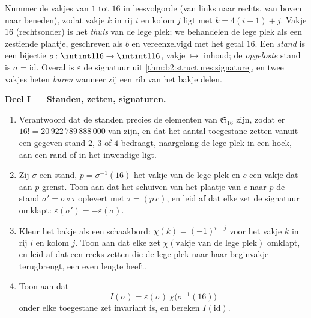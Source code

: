 \begin{problem}
\label{pb:b2:structures:1}
Nummer de vakjes van $1$ tot $16$ in leesvolgorde (van links naar
rechts, van boven naar beneden), zodat vakje $k$ in rij $i$ en
kolom $j$ ligt met $k = 4(i - 1) + j$. Vakje $16$ (rechtsonder) is
het \emph{thuis} van de lege plek; we behandelen de lege plek als
een zestiende plaatje, geschreven als $b$ en vereenzelvigd met het
getal $16$. Een \emph{stand} is een bijectie $\sigma \colon
\intint1{16} \to \intint1{16}$, vakje $\mapsto$ inhoud; de
\emph{opgeloste} stand is $\sigma = \mathrm{id}$. Overal is
$\varepsilon$ de signatuur uit
\cref{thm:b2:structures:signature}, en twee vakjes heten
\emph{buren} wanneer zij een rib van het bakje delen.

\medskip
\noindent\textbf{Deel I --- Standen, zetten, signaturen.}
\begin{enumerate}
  \item Verantwoord dat de standen precies de elementen van
        $\mathfrak{S}_{16}$ zijn, zodat er $16! =
        20\,922\,789\,888\,000$ van zijn, en dat het aantal
        toegestane zetten vanuit een gegeven stand $2$, $3$ of $4$
        bedraagt, naargelang de lege plek in een hoek, aan een
        rand of in het inwendige ligt.
  \item Zij $\sigma$ een stand, $p = \sigma^{-1}(16)$ het vakje
        van de lege plek en $c$ een vakje dat aan $p$ grenst. Toon
        aan dat het schuiven van het plaatje van $c$ naar $p$ de
        stand $\sigma' = \sigma \circ \tau$ oplevert met $\tau =
        (p\ c)$, en leid af dat elke zet de signatuur omklapt:
        $\varepsilon(\sigma') = -\varepsilon(\sigma)$.
  \item Kleur het bakje als een schaakbord: $\chi(k) = (-1)^{i+j}$
        voor het vakje $k$ in rij $i$ en kolom $j$. Toon aan dat
        elke zet $\chi(\text{vakje van de lege plek})$ omklapt, en
        leid af dat een reeks zetten die de lege plek naar haar
        beginvakje terugbrengt, een even lengte heeft.
  \item Toon aan dat
        \[
        I(\sigma) = \varepsilon(\sigma)\,
        \chi\bigl(\sigma^{-1}(16)\bigr)
        \]
        onder elke toegestane zet invariant is, en bereken
        $I(\mathrm{id})$.
\end{enumerate}


\end{problem}
